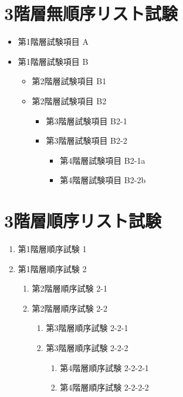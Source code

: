 \documentclass[jp]{../../elegantbook}
\begin{document}
\section{3階層無順序リスト試験}
\begin{itemize}
\item 第1階層試験項目 A
\item 第1階層試験項目 B
    \begin{itemize}
    \item 第2階層試験項目 B1
    \item 第2階層試験項目 B2
        \begin{itemize}
        \item 第3階層試験項目 B2-1
        \item 第3階層試験項目 B2-2
            \begin{itemize}
            \item 第4階層試験項目 B2-1a
            \item 第4階層試験項目 B2-2b
            \end{itemize}
        \end{itemize}
    \end{itemize}
\end{itemize}

\section{3階層順序リスト試験}
\begin{enumerate}
\item 第1階層順序試験 1
\item 第1階層順序試験 2
    \begin{enumerate}
    \item 第2階層順序試験 2-1
    \item 第2階層順序試験 2-2
        \begin{enumerate}
        \item 第3階層順序試験 2-2-1
        \item 第3階層順序試験 2-2-2
            \begin{enumerate}
            \item 第4階層順序試験 2-2-2-1
            \item 第4階層順序試験 2-2-2-2
            \end{enumerate}
        \end{enumerate}
    \end{enumerate}
\end{enumerate}
\end{document}
